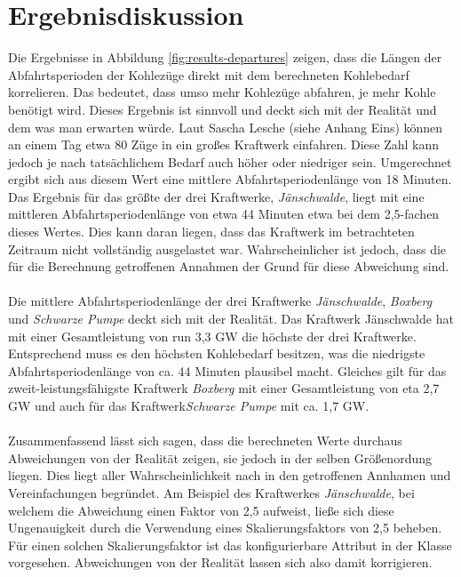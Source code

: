 \section{Ergebnisdiskussion}

Die Ergebnisse in Abbildung \ref{fig:results-departures} zeigen, dass die Längen der Abfahrtsperioden der Kohlezüge direkt mit dem berechneten Kohlebedarf korrelieren. Das bedeutet, dass umso mehr Kohlezüge abfahren, je mehr Kohle benötigt wird. Dieses Ergebnis ist sinnvoll und deckt sich mit der Realität und dem was man erwarten würde. Laut Sascha Lesche (siehe Anhang Eins) können an einem Tag etwa 80 Züge in ein großes Kraftwerk einfahren. Diese Zahl kann jedoch je nach tatsächlichem Bedarf auch höher oder niedriger sein. Umgerechnet ergibt sich aus diesem Wert eine mittlere Abfahrtsperiodenlänge von 18 Minuten. Das Ergebnis für das größte der drei Kraftwerke, \emph{Jänschwalde}, liegt mit eine mittleren Abfahrtsperiodenlänge von etwa 44 Minuten etwa bei dem 2,5-fachen dieses Wertes. Dies kann daran liegen, dass das Kraftwerk im betrachteten Zeitraum nicht vollständig ausgelastet war. Wahrscheinlicher ist jedoch, dass die für die Berechnung getroffenen Annahmen der Grund für diese Abweichung sind.\\
\\
Die mittlere Abfahrtsperiodenlänge der drei Kraftwerke \emph{Jänschwalde}, \emph{Boxberg} und \emph{Schwarze Pumpe} deckt sich mit der Realität. Das Kraftwerk Jänschwalde hat mit einer Gesamtleistung von run 3,3 GW die höchste der drei Kraftwerke. Entsprechend muss es den höchsten Kohlebedarf besitzen, was die niedrigste Abfahrtsperiodenlänge von ca. 44 Minuten plausibel macht. Gleiches gilt für das zweit-leistungsfähigste Kraftwerk \emph{Boxberg} mit einer Gesamtleistung von eta 2,7 GW und auch für das Kraftwerk\emph{Schwarze Pumpe} mit ca. 1,7 GW. \cite{noauthor_bundesnetzagentur_nodate}\\
\\
Zusammenfassend lässt sich sagen, dass die berechneten Werte durchaus Abweichungen von der Realität zeigen, sie jedoch in der selben Größenordung liegen. Dies liegt aller Wahrscheinlichkeit nach in den getroffenen Annhamen und Vereinfachungen begründet. Am Beispiel des Kraftwerkes \emph{Jänschwalde}, bei welchem die Abweichung einen Faktor von 2,5 aufweist, ließe sich diese Ungenauigkeit durch die Verwendung eines Skalierungsfaktors von 2,5 beheben. Für einen solchen Skalierungsfaktor ist das konfigurierbare Attribut  in der Klasse  vorgesehen. Abweichungen von der Realität lassen sich also damit korrigieren.